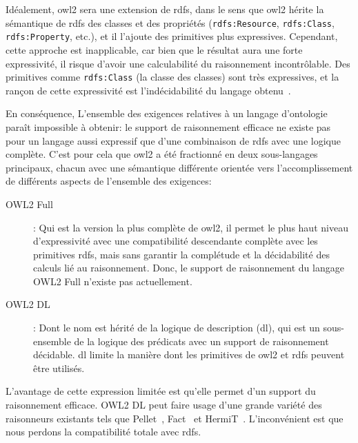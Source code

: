 Idéalement, \acrshort{owl2} sera une extension de \acrshort{rdfs},
dans le sens que \acrshort{owl2} hérite la sémantique de
\acrshort{rdfs} des classes et des propriétés (\texttt{rdfs:Resource},
\texttt{rdfs:Class}, \texttt{rdfs:Property}, etc.), et il l'ajoute des
primitives plus expressives. Cependant, cette approche est
inapplicable, car bien que le résultat aura une forte expressivité, il
risque d'avoir une calculabilité du raisonnement incontrôlable. Des
primitives comme \texttt{rdfs:Class} (la classe des classes) sont très
expressives, et la rançon de cette expressivité est l'indécidabilité
du langage obtenu~\cite{antoniou2012semantic}.\medskip

En conséquence, L'ensemble des exigences relatives à un langage
d'ontologie paraît impossible à obtenir: le support de raisonnement
efficace ne existe pas pour un langage aussi expressif que d'une
combinaison de \acrshort{rdfs} avec une logique complète. C'est pour
cela que \acrshort{owl2} a été fractionné en deux sous-langages
principaux, chacun avec une sémantique différente orientée vers
l'accomplissement de différents aspects de l'ensemble des exigences:

\renewcommand{\descriptionlabel}[1]{\hspace{0.5cm}\textbullet~\textsf{#1}}
\begin{description}
\item[OWL2 Full]: Qui est la version la plus complète de
  \acrshort{owl2}, il permet le plus haut niveau d'expressivité avec
  une compatibilité descendante complète avec les primitives
  \acrshort{rdfs}, mais sans garantir la complétude et la décidabilité
  des calculs lié au raisonnement. Donc, le support de raisonnement du
  langage \textsf{OWL2 Full} n'existe pas actuellement.

\item[OWL2 DL]: Dont le nom est hérité de la logique de description
  (\acrshort{dl}), qui est un sous-ensemble de la logique des
  prédicats avec un support de raisonnement décidable. \acrshort{dl}
  limite la manière dont les primitives de \acrshort{owl2} et
  \acrshort{rdfs} peuvent être utilisés.\medskip
\end{description}
\enddescription

L'avantage de cette expression limitée est qu'elle permet d'un support
du raisonnement efficace. \textsf{OWL2 DL} peut faire usage d'une
grande variété des raisonneurs existants tels que
Pellet~\cite{sirin2004pellet}, Fact~\cite{horrocks1999fact} et
HermiT~\cite{shearer2008hermit}. L'inconvénient est que nous perdons
la compatibilité totale avec \acrshort{rdfs}.\medskip

